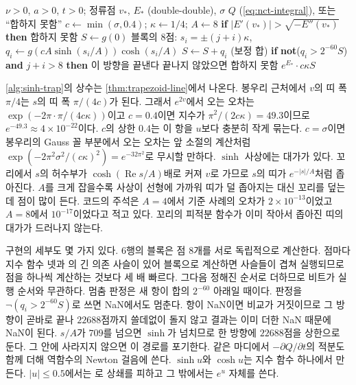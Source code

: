 \begin{algorithm}[htbp]
\begin{algorithmic}[1]
\Require $\nu>0$, $a>0$, $t>0$; 정류점 $v_*$, $E_*$ (double-double), $\sigma$
\Ensure $Q$ (\cref{eq:nct-integral}), 또는 ``합하지 못함''
\State $c\gets\min(\sigma,0.4)$; $\kappa\gets1/4$; $A\gets8$
\State \textbf{if} $|E'(v_*)|>\sqrt{-E''(v_*)}$ \textbf{then} \Return 합하지 못함 
\State $S\gets g(0)$ 
    \State 블록의 $8$점: $s_i=\pm(j+i)\kappa$, $q_i\gets g(cA\sinh(s_i/A))\cosh(s_i/A)$ 
     $S\gets S+q_i$ (보정 합) 
      \State \textbf{if} \textbf{not}($q_i>2^{-60}S$) \textbf{and} $j+i>8$ \textbf{then} 이 방향을 끝낸다 
    \EndFor
  \EndFor
  \State 끝나지 않았으면 \Return 합하지 못함
\EndFor
\State \Return $e^{E_*}\cdot c\kappa S$
\end{algorithmic}
\caption{비중심 $t$의 반대쪽 꼬리 (stardust 의 )}
\label{alg:sinh-trap}
\end{algorithm}

\cref{alg:sinh-trap}의 상수는 \cref{thm:trapezoid-line}에서 나온다. 봉우리 근처에서 $v$의 띠 폭 $\pi/4$는 $s$의 띠 폭 $\pi/(4c)$가 된다. 그래서 $e^{2v}$에서 오는 오차는 $\exp(-2\pi\cdot\pi/(4c\kappa))$이고 $c=0.4$이면 지수가 $\pi^2/(2c\kappa)=49.3$이므로 $e^{-49.3}\approx4\times10^{-22}$이다. $c$의 상한 $0.4$는 이 항을 $u$보다 충분히 작게 묶는다. $c=\sigma$이면 봉우리의 Gauss 꼴 부분에서 오는 오차는 앞 소절의 계산처럼 $\exp(-2\pi^2\sigma^2/(c\kappa)^2)=e^{-32\pi^2}$로 무시할 만하다. $\sinh$ 사상에는 대가가 있다. 꼬리에서 $s$의 허수부가 $\cosh(\operatorname{Re}s/A)$배로 커져 $v$로 가므로 $s$의 띠가 $e^{-|s|/A}$처럼 좁아진다. $A$를 크게 잡을수록 사상이 선형에 가까워 띠가 덜 좁아지는 대신 꼬리를 덮는 데 점이 많이 든다. 코드의 주석은 $A=4$에서 기준 사례의 오차가 $2\times10^{-13}$이었고 $A=8$에서 $10^{-17}$이었다고 적고 있다. 꼬리의 피적분 함수가 이미 작아서 좁아진 띠의 대가가 드러나지 않는다.

구현의 세부도 몇 가지 있다. 6행의 블록은 점 $8$개를 서로 독립적으로 계산한다. 점마다 지수 함수 넷과 의 긴 의존 사슬이 있어 블록으로 계산하면 사슬들이 겹쳐 실행되므로 점을 하나씩 계산하는 것보다 세 배 빠르다. 그다음 정해진 순서로 더하므로 비트가 실행 순서와 무관하다. 멈춤 판정은 새 항이 합의 $2^{-60}$ 아래일 때이다. 판정을 $\neg(q_i>2^{-60}S)$로 쓰면 NaN에서도 멈춘다. 항이 NaN이면 비교가 거짓이므로 그 방향이 곧바로 끝나 $22688$점까지 쓸데없이 돌지 않고 결과는 이미 더한 NaN 때문에 NaN이 된다. $s/A$가 $709$를 넘으면 $\sinh$가 넘치므로 한 방향에 $22688$점을 상한으로 둔다. 그 안에 사라지지 않으면 이 경로를 포기한다. 같은 마디에서 $-\partial Q/\partial t$의 적분도 함께 더해 역함수의 Newton 걸음에 쓴다. $\sinh u$와 $\cosh u$는 지수 함수 하나에서 만든다. $|u|\le0.5$에서는 로 상쇄를 피하고 그 밖에서는 $e^u$ 자체를 쓴다.

